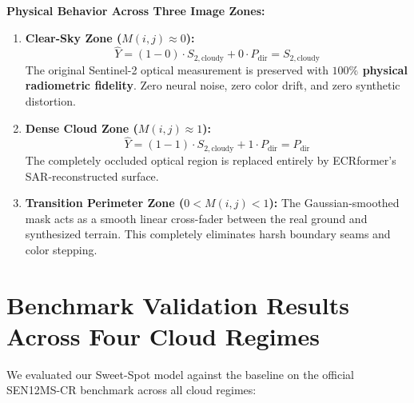 \documentclass[11pt,a4paper]{article}
\begin{document}
\begin{center}
\begin{tcolorbox}[colback=boxbg,colframe=bordercolor,width=0.98\linewidth]
\textbf{\textcolor{primary}{Physical Behavior Across Three Image Zones:}}
\begin{enumerate}[leftmargin=1.5em, itemsep=0.3em]
    \item \textbf{Clear-Sky Zone ($M(i, j) \approx 0$):}
    \begin{equation}
    \hat{Y} = (1 - 0) \cdot S_{2,\text{cloudy}} + 0 \cdot P_{\text{dir}} = S_{2,\text{cloudy}}
    \end{equation}
    The original Sentinel-2 optical measurement is preserved with \textbf{$100\%$ physical radiometric fidelity}. Zero neural noise, zero color drift, and zero synthetic distortion.
    
    \item \textbf{Dense Cloud Zone ($M(i, j) \approx 1$):}
    \begin{equation}
    \hat{Y} = (1 - 1) \cdot S_{2,\text{cloudy}} + 1 \cdot P_{\text{dir}} = P_{\text{dir}}
    \end{equation}
    The completely occluded optical region is replaced entirely by ECRformer's SAR-reconstructed surface.
    
    \item \textbf{Transition Perimeter Zone ($0 < M(i, j) < 1$):}
    The Gaussian-smoothed mask acts as a smooth linear cross-fader between the real ground and synthesized terrain. This completely eliminates harsh boundary seams and color stepping.
\end{enumerate}
\end{tcolorbox}
\end{center}

\newpage

\section{Benchmark Validation Results Across Four Cloud Regimes}

We evaluated our Sweet-Spot model against the baseline on the official SEN12MS-CR benchmark across all cloud regimes:
\end{document}
